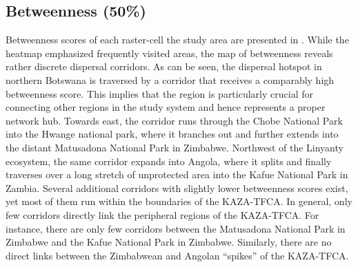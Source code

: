 \documentclass[abstract=on,10pt,a4paper,bibliography=totocnumbered]{article}
\begin{document}
\subsection{Betweenness (50\%)}
Betweenness scores of each raster-cell the study area are presented in
. While the heatmap emphasized frequently visited areas, the
map of betweenness reveals rather discrete dispersal corridors. As can be seen,
the dispersal hotspot in northern Botswana is traversed by a corridor that
receives a comparably high betweenness score. This implies that the region is
particularly crucial for connecting other regions in the study system and hence
represents a proper network hub. Towards east, the corridor runs through the
Chobe National Park into the Hwange national park, where it branches out and
further extends into the distant Matusadona National Park in Zimbabwe. Northwest
of the Linyanty ecosystem, the same corridor expands into Angola, where it
splits and finally traverses over a long stretch of unprotected area into the
Kafue National Park in Zambia. Several additional corridors with slightly lower
betweenness scores exist, yet most of them run within the boundaries of the
KAZA-TFCA. In general, only few corridors directly link the peripheral regions
of the KAZA-TFCA. For instance, there are only few corridors between the
Matusadona National Park in Zimbabwe and the Kafue National Park in Zimbabwe.
Similarly, there are no direct links between the Zimbabwean and Angolan
``spikes'' of the KAZA-TFCA.
\end{document}
